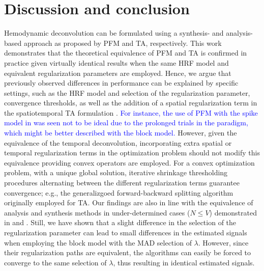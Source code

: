 
\section{Discussion and conclusion}

Hemodynamic deconvolution can be formulated using a synthesis- and
analysis-based approach as proposed by PFM and TA, respectively. This work
demonstrates that the theoretical equivalence of PFM and TA is confirmed in
practice given virtually identical results when the same HRF model and
equivalent regularization parameters are employed. Hence, we argue that
previously observed differences in performance can be explained by specific
settings, such as the HRF model and selection of the regularization parameter,
convergence thresholds, as well as the addition of a spatial regularization term
in the spatiotemporal TA formulation \citep{Karahanoglu2013TotalactivationfMRI}.
\textcolor{blue}{For instance, the use of PFM with the spike model in
\citep{Tan_2017} was seen not to be ideal due to the prolonged trials in the
paradigm, which might be better described with the block model.} However, given the equivalence of
the temporal deconvolution, incorporating extra spatial or temporal
regularization terms in the optimization problem should not modify this
equivalence providing convex operators are employed. For a convex optimization
problem, with a unique global solution, iterative shrinkage thresholding
procedures alternating between the different regularization terms guarantee
convergence; e.g., the generalizgoed forward-backward splitting
\citep{Raguet2013GeneralizedForwardBackward} algorithm originally employed for
TA. Our findings are also in line with the equivalence of analysis and synthesis
methods in under-determined cases (\(N \leq V\)) demonstrated in
\citep{Elad2007Analysisversussynthesis} and \citep{ortelli2019synthesis}. Still,
we have shown that a slight difference in the selection of the regularization
parameter can lead to small differences in the estimated signals when employing
the block model with the MAD selection of $\lambda$. However, since their
regularization paths are equivalent, the algorithms can easily be forced to
converge to the same selection of $\lambda$, thus resulting in identical
estimated signals.

